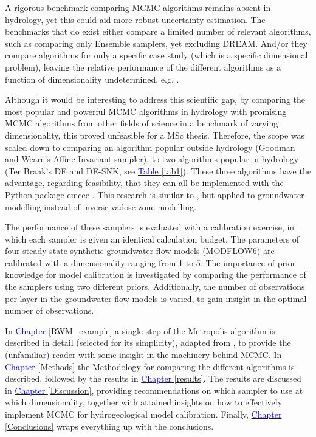A rigorous benchmark comparing MCMC algorithms remains absent in hydrology, yet this could aid more robust uncertainty estimation. The benchmarks that do exist either compare a limited number of relevant algorithms, such as \cite{brunetti2023depth} comparing only Ensemble samplers, yet excluding DREAM. And/or they compare algorithms for only a specific case study (which is a specific dimensional problem), leaving the relative performance of the different algorithms as a function of dimensionality undetermined, e.g. \cite{bacci2023comparison}. 

Although it would be interesting to address this scientific gap, by comparing the most popular and powerful MCMC algorithms in hydrology with promising MCMC algorithms from other fields of science in a benchmark of varying dimensionality, this proved unfeasible for a MSc thesis. 
Therefore, the scope was scaled down to comparing an algorithm popular outside hydrology (Goodman and Weare's Affine Invariant sampler), to two algorithms popular in hydrology (Ter Braak's DE and DE-SNK, see \hyperref[tab1]{\textcolor{blue}{Table} \ref*{tab1}}). These three algorithms have the advantage, regarding feasibility, that they can all be implemented with the Python package emcee \citep{foreman2013emcee}. This research is similar to \cite{brunetti2023depth}, but applied to groundwater modelling instead of inverse vadose zone modelling. %

The performance of these samplers is evaluated with a calibration exercise, in which each sampler is given an identical calculation budget. The parameters of four steady-state synthetic groundwater flow models (MODFLOW6) are calibrated with a dimensionality ranging from 1 to 5. The importance of prior knowledge for model calibration is investigated by comparing the performance of the samplers using two different priors. Additionally, the number of observations per layer in the groundwater flow models is varied, to gain insight in the optimal number of observations. 

In \hyperref[RWM_example]{\textcolor{blue}{Chapter} \ref{RWM_example}} a single step of the Metropolis algorithm is described in detail (selected for its simplicity), adapted from \cite{johnson2022bayes}, to provide the (unfamiliar) reader with some insight in the machinery behind MCMC. In \hyperref[Methods]{\textcolor{blue}{Chapter} \ref{Methods}} the Methodology for comparing the different algorithms is described, followed by the results in \hyperref[results]{\textcolor{blue}{Chapter }\ref{results}}. The results are discussed in \hyperref[Discussion]{\textcolor{blue}{Chapter }\ref{Discussion}}, providing recommendations on which sampler to use at which dimensionality, together with attained insights on how to effectively implement MCMC for hydrogeological model calibration. Finally, \hyperref[Conclusions]{\textcolor{blue}{Chapter }\ref{Conclusions}} wraps everything up with the conclusions. %

